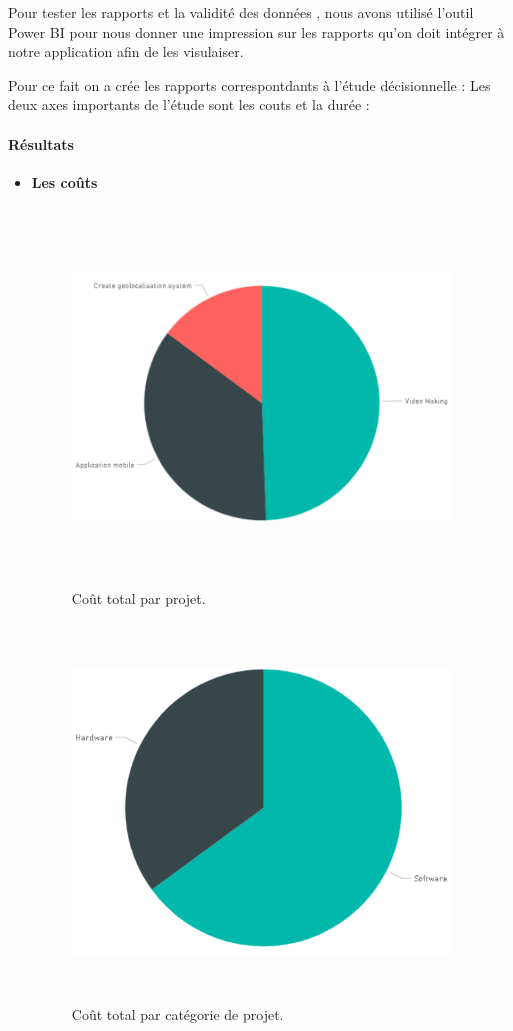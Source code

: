 Pour tester les rapports et la validit\'{e} des donn\'{e}es , nous avons utilis\'{e} l'outil
Power BI pour nous donner une impression sur les rapports qu'on doit
int\'{e}grer \`{a} notre application afin de les visulaiser.

\bigskip
Pour ce fait on a cr\'{e}e les rapports correspontdants \`{a} l'\'{e}tude d\'{e}cisionnelle :
Les deux axes importants de l'\'{e}tude sont les couts et la dur\'{e}e :


\paragraph{R\'{e}sultats  }
\begin{itemize}

\item{ \textbf{Les  co\^{u}ts}  }


\begin{figure}[H]
\center
\includegraphics[width=10cm,height=10cm]{./figures/rpb1.png}
\caption{Co\^{u}t total par projet.}

\end{figure}

\begin{figure}[H]
\center
\includegraphics[width=10cm,height=10cm]{./figures/rpb2.png}
\caption{Co\^{u}t total par catégorie de projet.}


\end{figure}
\end{itemize}
